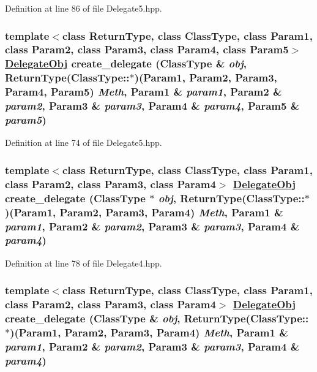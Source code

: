 Definition at line 86 of file Delegate5.hpp.\hypertarget{namespaceDL_a13}{
\subsubsection[create\_\-delegate]{\setlength{\rightskip}{0pt plus 5cm}template$<$class Return\-Type, class Class\-Type, class Param1, class Param2, class Param3, class Param4, class Param5$>$ \hyperlink{namespaceDL_a0}{Delegate\-Obj} create\_\-delegate (Class\-Type \& {\em obj}, Return\-Type(Class\-Type::$\ast$)(Param1, Param2, Param3, Param4, Param5) {\em Meth}, Param1 \& {\em param1}, Param2 \& {\em param2}, Param3 \& {\em param3}, Param4 \& {\em param4}, Param5 \& {\em param5})}}
\label{namespaceDL_a13}




Definition at line 74 of file Delegate5.hpp.\hypertarget{namespaceDL_a12}{
\subsubsection[create\_\-delegate]{\setlength{\rightskip}{0pt plus 5cm}template$<$class Return\-Type, class Class\-Type, class Param1, class Param2, class Param3, class Param4$>$ \hyperlink{namespaceDL_a0}{Delegate\-Obj} create\_\-delegate (Class\-Type $\ast$ {\em obj}, Return\-Type(Class\-Type::$\ast$)(Param1, Param2, Param3, Param4) {\em Meth}, Param1 \& {\em param1}, Param2 \& {\em param2}, Param3 \& {\em param3}, Param4 \& {\em param4})}}
\label{namespaceDL_a12}




Definition at line 78 of file Delegate4.hpp.\hypertarget{namespaceDL_a11}{
\subsubsection[create\_\-delegate]{\setlength{\rightskip}{0pt plus 5cm}template$<$class Return\-Type, class Class\-Type, class Param1, class Param2, class Param3, class Param4$>$ \hyperlink{namespaceDL_a0}{Delegate\-Obj} create\_\-delegate (Class\-Type \& {\em obj}, Return\-Type(Class\-Type::$\ast$)(Param1, Param2, Param3, Param4) {\em Meth}, Param1 \& {\em param1}, Param2 \& {\em param2}, Param3 \& {\em param3}, Param4 \& {\em param4})}}
\label{namespaceDL_a11}




